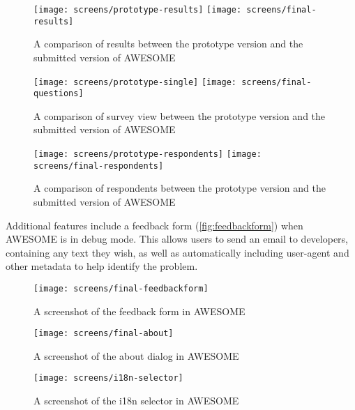 	\begin{figure}[H]
		\texttt{[image: screens/prototype-results]}
		\texttt{[image: screens/final-results]}
		\caption{A comparison of results between the prototype version and the submitted version of \acs{AWESOME}}
		\label{fig:results-comparison}
	\end{figure}
	
	\begin{figure}[H]
		\texttt{[image: screens/prototype-single]}
		\texttt{[image: screens/final-questions]}
		\caption{A comparison of survey view between the prototype version and the submitted version of \acs{AWESOME}}
		\label{fig:view-comparison}
	\end{figure}
	
	\begin{figure}[H]
		\texttt{[image: screens/prototype-respondents]}
		\texttt{[image: screens/final-respondents]}
		\caption{A comparison of respondents between the prototype version and the submitted version of \acs{AWESOME}}
		\label{fig:respondents-comparison}
	\end{figure}
	
	Additional features include a feedback form (\autoref{fig:feedbackform}) when \ac{AWESOME} is in debug mode.
	This allows users to send an email to developers, containing any text they wish, as well as automatically including user-agent and other metadata to help identify the problem.
	
	\begin{figure}[H]
		\texttt{[image: screens/final-feedbackform]}
		\caption{A screenshot of the feedback form in \acs{AWESOME}}
		\label{fig:feedbackform}
	\end{figure}
	
	\begin{figure}[H]
		\texttt{[image: screens/final-about]}
		\caption{A screenshot of the about dialog in \acs{AWESOME}}
		\label{fig:aboutpage}
	\end{figure}
	
	\begin{figure}[H]
		\centering \texttt{[image: screens/i18n-selector]}
		\caption{A screenshot of the \ac{i18n} selector in \acs{AWESOME}}
		\label{fig:i18nselector}
	\end{figure}